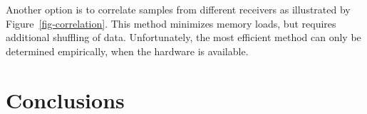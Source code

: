 \documentclass{article}
\begin{document}
Another option is to correlate samples from different receivers as illustrated
by Figure~\ref{fig-correlation}.
This method minimizes memory loads, but requires additional shuffling of data.
Unfortunately, the most efficient method can only be determined empirically,
when the hardware is available.

\section{Conclusions}




\end{document}
